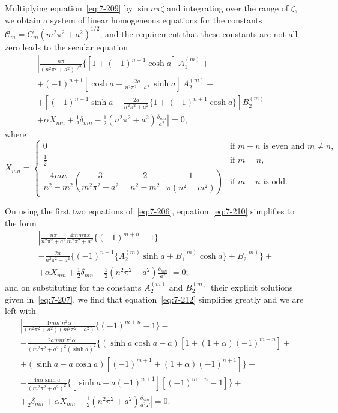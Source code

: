 Multiplying equation~\eqref{eq:7-209} by $\sin n\pi\zeta$ and integrating over the range of
$\zeta$, we obtain a system of linear homogeneous equations for the constants
$\mathscr{C}_m = C_m(m^2\pi^2+a^2)^{1/2}$; and the requirement that these constants are
not all zero leads to the secular equation
\begin{multline}
\label{eq:7-210}
\left|\frac{n\pi}{(n^2\pi^2+a^2)^{1/2}}
\{[1+(-1)^{n+1}\cosh a]\,A_1^{(m)}+\right. \\
+(-1)^{n+1}\left[\cosh a
- \frac{2a}{n^2\pi^2+a^2}\,\sinh a\right]\,A_2^{(m)} + \\
+\left[(-1)^{n+1}\sinh a
- \frac{2a}{n^2\pi^2+a^2}
\{1+(-1)^{n+1}\cosh a\}\right] B_2^{(m)} + \\
\left.+\alpha X_{mn}+\tfrac{1}{2}\delta_{mn}
- \tfrac{1}{2}(n^2\pi^2+a^2)\frac{\delta_{mn}}{a^2}\right| = 0,
\end{multline}
where
\begin{equation}
\label{eq:7-211}
X_{mn} = \begin{cases}
0 & \text{if } m+n \text{ is even and } m \neq n,\\
\frac{1}{2} & \text{if } m = n,\\
\dfrac{4mn}{n^2-m^2}\left(\dfrac{3}{m^2\pi^2+a^2}
- \dfrac{2}{n^2-m^2}\right.\cdot
\left.\dfrac{1}{\pi(n^2-m^2)}\right)
& \text{if } m+n \text{ is odd.}
\end{cases}
\end{equation}

On using the first two equations of~\eqref{eq:7-206}, equation~\eqref{eq:7-210} simplifies to
the form
\begin{multline}
\label{eq:7-212}
\left|\frac{n\pi}{n^2\pi^2+a^2}\frac{4mm\pi x}{m^2\pi^2+a^2}
\{(-1)^{m+n}-1\} - \right.\\
-\frac{2a}{n^2\pi^2+a^2}
\{(-1)^{n+1}\{A_2^{(m)}\sinh a + B_1^{(m)}\cosh a\} +
B_2^{(m)}\} + \\
\left.+\alpha X_{mn}+\tfrac{1}{2}\delta_{mn}
-\tfrac{1}{2}(n^2\pi^2+a^2)\frac{\delta_{mn}}{a^2}\right| = 0;
\end{multline}
and on substituting for the constants $A_2^{(m)}$ and $B_2^{(m)}$ their explicit solutions
given in~\eqref{eq:7-207}, we find that equation~\eqref{eq:7-212} simplifies greatly and we are
left with
\begin{multline}
\label{eq:7-213}
\left|\frac{4mm'n^2\alpha}{(n^2\pi^2+a^2)(m^2\pi^2+a^2)}
\{(-1)^{m+n}-1\} -\right.\\
- \frac{2amm'\pi^2\alpha}{(m^2\pi^2+a^2)^2(\sinh a)^2}
\{(\sinh a\cosh a - a)[1+(1+\alpha)(-1)^{m+n}] + \\
+(\sinh a - a\cosh a)[(-1)^{m+1} + (1+\alpha)(-1)^{n+1}]
\} - \\
- \frac{4a\alpha\sinh a}{(m^2\pi^2+a^2)^2}
\{[\sinh a + a(-1)^{n+1}][(-1)^{m+n}-1]\} + \\
\left.+\tfrac{1}{2}\delta_{mn}+\alpha X_{mn}
-\tfrac{1}{2}(n^2\pi^2+a^2)\frac{\delta_{mn}}{a^2T}\right| = 0.
\end{multline}


